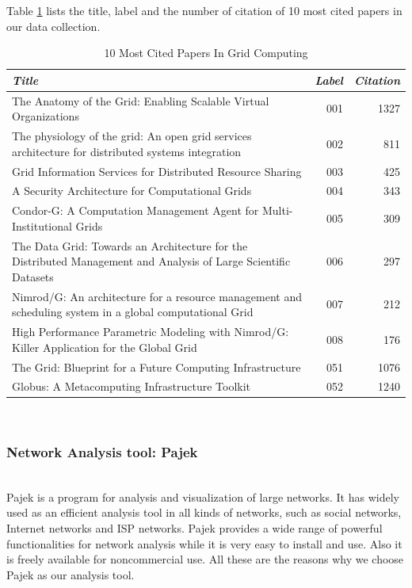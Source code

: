 Table \ref{T:name} lists the title, label and the number of citation of 10 most cited papers in our data collection.
\begin{table}[htb]
\caption{ 10 Most Cited Papers In Grid Computing}
\label {T:name}
\begin{center}
\begin{small}
\begin {tabular} {|p{5.5cm}|r|r|}
\hline 
{\em \bf Title} & {\em \bf Label} &{\em \bf Citation}\\
\hline
The Anatomy of the Grid: Enabling Scalable Virtual Organizations & 001&1327 \\
\hline
The physiology of the grid: An open grid services architecture for distributed systems integration & 002&811 \\
\hline
Grid Information Services for Distributed Resource Sharing  & 003&425 \\
\hline
A Security Architecture for Computational Grids  & 004&343 \\
\hline
Condor-G: A Computation Management Agent for Multi-Institutional Grids & 005&309 \\
\hline
The Data Grid: Towards an Architecture for the Distributed Management and Analysis of Large 
Scientific Datasets & 006&297 \\
\hline
Nimrod/G: An architecture for a resource management and scheduling system in a global computational Grid & 007&212 \\
\hline
High Performance Parametric Modeling with Nimrod/G: Killer Application for the Global Grid & 008&176 \\
\hline
The Grid: Blueprint for a Future Computing Infrastructure & 051&1076 \\
\hline
Globus: A Metacomputing Infrastructure Toolkit& 052&1240 \\
\hline
\end {tabular}

\end{small}
\end{center}
\end {table}
~\\
\subsubsection{Network Analysis tool: Pajek}
~\\
Pajek \cite{batagelj1998pajek, batagelj2002pajek} is a program for analysis and visualization of large networks. It has widely used as an efficient analysis tool in all kinds of networks, such as social networks, Internet networks and ISP networks. Pajek provides a wide range of powerful functionalities for network analysis while it is very easy to install and use. Also it is freely available for noncommercial use. All these are the reasons why we choose Pajek as our analysis tool.  

